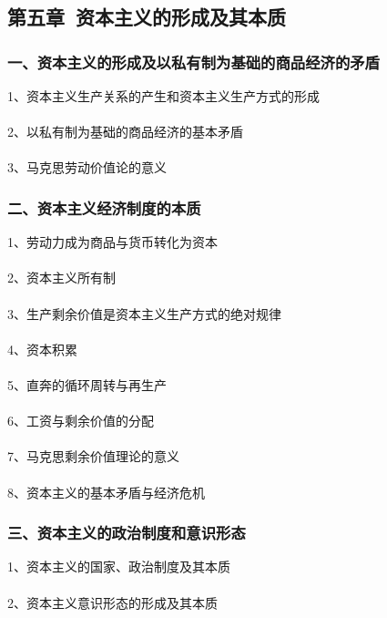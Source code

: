 \documentclass{ctexart}
\begin{document}
\subsection{第五章\ 资本主义的形成及其本质}
\subsubsection{一、资本主义的形成及以私有制为基础的商品经济的矛盾}
1、资本主义生产关系的产生和资本主义生产方式的形成
\\\\

2、以私有制为基础的商品经济的基本矛盾
\\\\

3、马克思劳动价值论的意义

\subsubsection{二、资本主义经济制度的本质}
1、劳动力成为商品与货币转化为资本
\\\\

2、资本主义所有制
\\\\

3、生产剩余价值是资本主义生产方式的绝对规律
\\\\

4、资本积累
\\\\

5、直奔的循环周转与再生产
\\\\

6、工资与剩余价值的分配
\\\\

7、马克思剩余价值理论的意义
\\\\

8、资本主义的基本矛盾与经济危机

\subsubsection{三、资本主义的政治制度和意识形态}
1、资本主义的国家、政治制度及其本质
\\\\

2、资本主义意识形态的形成及其本质
\end{document}
